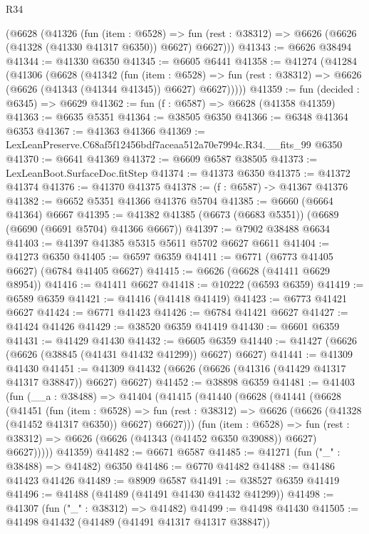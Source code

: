 \begin{lexlean}{R34}
\begin{coremodule}
    (@6628
      (@41326
        (fun (item : @6528) =>
        fun (rest : @38312) => @6626 (@6626 (@41328 (@41330 @41317 @6350)) @6627) @6627)))
@41343 := @6626 @38494
@41344 := @41330 @6350
@41345 := @6605 @6441
@41358 := @41274
    (@41284
      (@41306
        (@6628
          (@41342
            (fun (item : @6528) =>
            fun (rest : @38312) => @6626 (@6626 (@41343 (@41344 @41345)) @6627) @6627)))))
@41359 := fun (decided : @6345) => @6629
@41362 := fun (f : @6587) => @6628 (@41358 @41359)
@41363 := @6635 @5351
@41364 := @38505 @6350
@41366 := @6348 @41364 @6353
@41367 := @41363 @41366
@41369 := LexLeanPreserve.C68af5f12456bdf7aceaa512a70e7994c.R34.__fits_99 @6350
@41370 := @6641 @41369
@41372 := @6609 @6587 @38505
@41373 := LexLeanBoot.SurfaceDoc.fitStep
@41374 := @41373 @6350
@41375 := @41372 @41374
@41376 := @41370 @41375
@41378 := (f : @6587) -> @41367 @41376
@41382 := @6652 @5351 @41366 @41376 @5704
@41385 := @6660 (@6664 @41364) @6667
@41395 := @41382 @41385 (@6673 (@6683 @5351)) (@6689 (@6690 (@6691 @5704) @41366 @6667))
@41397 := @7902 @38488 @6634
@41403 := @41397 @41385 @5315 @5611 @5702 @6627 @6611
@41404 := @41273 @6350
@41405 := @6597 @6359
@41411 := @6771 (@6773 @41405 @6627) (@6784 @41405 @6627)
@41415 := @6626 (@6628 (@41411 @6629 @8954))
@41416 := @41411 @6627
@41418 := @10222 (@6593 @6359)
@41419 := @6589 @6359
@41421 := @41416 (@41418 @41419)
@41423 := @6773 @41421 @6627
@41424 := @6771 @41423
@41426 := @6784 @41421 @6627
@41427 := @41424 @41426
@41429 := @38520 @6359 @41419
@41430 := @6601 @6359
@41431 := @41429 @41430
@41432 := @6605 @6359
@41440 := @41427 (@6626 (@6626 (@38845 (@41431 @41432 @41299)) @6627) @6627)
@41441 := @41309 @41430
@41451 := @41309 @41432 (@6626 (@6626 (@41316 (@41429 @41317 @41317 @38847)) @6627) @6627)
@41452 := @38898 @6359
@41481 := @41403
    (fun (__a : @38488) =>
    @41404
      (@41415
        (@41440
          (@6628
            (@41441
              (@6628
                (@41451
                  (fun (item : @6528) =>
                  fun (rest : @38312) => @6626 (@6626 (@41328 (@41452 @41317 @6350)) @6627) @6627)))
              (fun (item : @6528) =>
              fun (rest : @38312) => @6626 (@6626 (@41343 (@41452 @6350 @39088)) @6627) @6627)))))
      @41359)
@41482 := @6671 @6587
@41485 := @41271 (fun ("_" : @38488) => @41482) @6350
@41486 := @6770 @41482
@41488 := @41486 @41423 @41426
@41489 := @8909 @6587
@41491 := @38527 @6359 @41419
@41496 := @41488 (@41489 (@41491 @41430 @41432 @41299))
@41498 := @41307 (fun ("_" : @38312) => @41482)
@41499 := @41498 @41430
@41505 := @41498 @41432 (@41489 (@41491 @41317 @41317 @38847))

\end{coremodule}
\end{lexlean}

